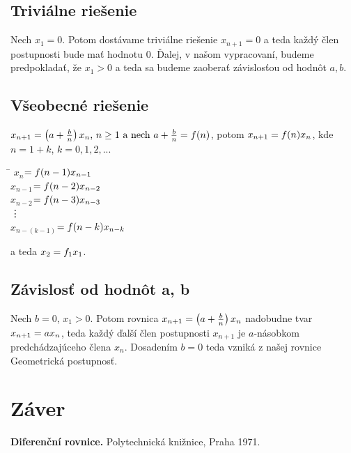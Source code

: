 \documentclass[a4paper,10pt]{article}
\theoremstyle{plain}
\theoremstyle{definition}
\begin{document}
\subsection{Triviálne riešenie}
Nech $x_{1}=0$.\newline
 Potom dostávame triviálne riešenie $x_{n+1} = 0$ a teda každý člen postupnosti bude mať hodnotu $0$. Ďalej, v našom vypracovaní, budeme predpokladať, že $ x_{1} > 0 $ a teda sa budeme 
zaoberať závislosťou od hodnôt $ a,b $.

\subsection{Všeobecné riešenie}
$x_{n+1}=\left(a+{\frac{b}{n}}\right)\*x_{n} \text{, } n \geq 1 \text{ a nech } a + {\frac{b}{n}} = f(n)$, potom
$x_{n+1}=f(n)\*x_{n}   $, kde $ n = 1 + k $, $ k = 0,1,2,... $
\begin{spacing}{1.3}
\begin{tabbing}
\hspace{2cm}\=\kill
$ x_{n}$\>$=f(n-1)\*x_{n-1}    $\\
$ x_{n-1}$\>$=f(n-2)\*x_{n-2}    $\\
$ x_{n-2}$\>$=f(n-3)\*x_{n-3}    $\\
\>\vdots \\
$ x_{n-(k-1)}$\>$=f(n-k)\*x_{n-k}    $
\end{tabbing} 
\end{spacing}
\noindent a teda $ x_{2} = f_{1}\*x_{1} $. 

\subsection{Závislosť od hodnôt a, b}
Nech $b=0$,  $x_{1}>0$.\newline
Potom rovnica $x_{n+1}=\left(a+{\frac{b}{n}}\right)\*x_{n}$  nadobudne tvar  $x_{n+1}= a\*x_{n}$, 
teda každý ďalší člen postupnosti $x_{n+1}$ je $a$-násobkom predchádzajúceho člena  $x_{n}$.
Dosadením  $b=0$ teda vzniká z našej rovnice Geometrická postupnosť.
\newpage
\section{Záver}


\begin{thebibliography}{9}
               {\bf Diferenční rovnice.}
           Polytechnická knižnice, Praha 1971.
\end{thebibliography}
\end{document}
